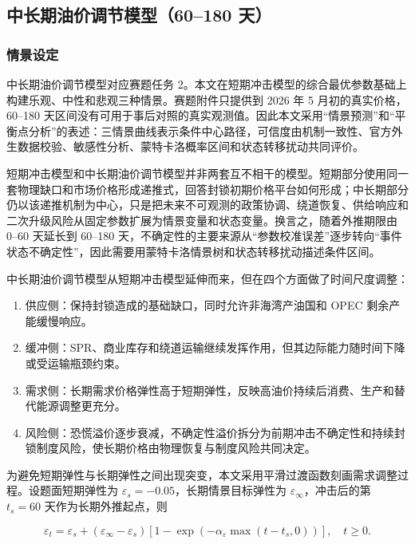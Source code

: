 \subsection{中长期油价调节模型（60--180 天）}

\subsubsection{情景设定}

中长期油价调节模型对应赛题任务 2。本文在短期冲击模型的综合最优参数基础上构建乐观、中性和悲观三种情景。赛题附件只提供到 2026 年 5 月初的真实价格，60--180 天区间没有可用于事后对照的真实观测值。因此本文采用“情景预测”和“平衡点分析”的表述：三情景曲线表示条件中心路径，可信度由机制一致性、官方外生数据校验、敏感性分析、蒙特卡洛概率区间和状态转移扰动共同评价。

短期冲击模型和中长期油价调节模型并非两套互不相干的模型。短期部分使用同一套物理缺口和市场价格形成递推式，回答封锁初期价格平台如何形成；中长期部分仍以该递推机制为中心，只是把未来不可观测的政策协调、绕道恢复、供给响应和二次升级风险从固定参数扩展为情景变量和状态变量。换言之，随着外推期限由 0--60 天延长到 60--180 天，不确定性的主要来源从“参数校准误差”逐步转向“事件状态不确定性”，因此需要用蒙特卡洛情景树和状态转移扰动描述条件区间。

中长期油价调节模型从短期冲击模型延伸而来，但在四个方面做了时间尺度调整：

\begin{enumerate}
  \item 供应侧：保持封锁造成的基础缺口，同时允许非海湾产油国和 OPEC 剩余产能缓慢响应。
  \item 缓冲侧：SPR、商业库存和绕道运输继续发挥作用，但其边际能力随时间下降或受运输瓶颈约束。
  \item 需求侧：长期需求价格弹性高于短期弹性，反映高油价持续后消费、生产和替代能源调整更充分。
  \item 风险侧：恐慌溢价逐步衰减，不确定性溢价拆分为前期冲击不确定性和持续封锁制度风险，使长期价格由物理恢复与制度风险共同决定。
\end{enumerate}

为避免短期弹性与长期弹性之间出现突变，本文采用平滑过渡函数刻画需求调整过程。设题面短期弹性为 \(\varepsilon_s=-0.05\)，长期情景目标弹性为 \(\varepsilon_\infty\)，冲击后的第 \(t_s=60\) 天作为长期外推起点，则

\begin{equation}
\varepsilon_t
=
\varepsilon_s
+
\left(\varepsilon_\infty-\varepsilon_s\right)
\left[1-\exp\left(-\alpha_\varepsilon\max(t-t_s,0)\right)\right],
\quad t\ge 0 .
\end{equation}

